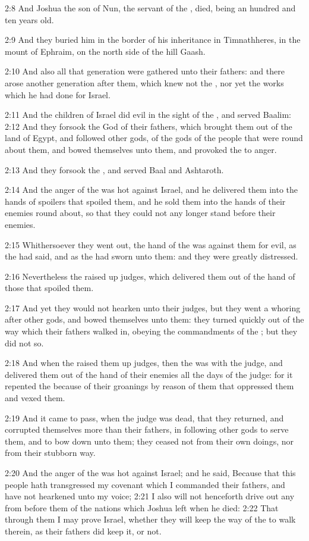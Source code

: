 2:8 And Joshua the son of Nun, the servant of the \LORD, died, being an hundred and ten years old.

2:9 And they buried him in the border of his inheritance in Timnathheres, in the mount of Ephraim, on the north side of the hill Gaash.

2:10 And also all that generation were gathered unto their fathers: and there arose another generation after them, which knew not the \LORD, nor yet the works which he had done for Israel.

2:11 And the children of Israel did evil in the sight of the \LORD, and served Baalim: 2:12 And they forsook the \LORD God of their fathers, which brought them out of the land of Egypt, and followed other gods, of the gods of the people that were round about them, and bowed themselves unto them, and provoked the \LORD to anger.

2:13 And they forsook the \LORD, and served Baal and Ashtaroth.

2:14 And the anger of the \LORD was hot against Israel, and he delivered them into the hands of spoilers that spoiled them, and he sold them into the hands of their enemies round about, so that they could not any longer stand before their enemies.

2:15 Whithersoever they went out, the hand of the \LORD was against them for evil, as the \LORD had said, and as the \LORD had sworn unto them: and they were greatly distressed.

2:16 Nevertheless the \LORD raised up judges, which delivered them out of the hand of those that spoiled them.

2:17 And yet they would not hearken unto their judges, but they went a whoring after other gods, and bowed themselves unto them: they turned quickly out of the way which their fathers walked in, obeying the commandments of the \LORD; but they did not so.

2:18 And when the \LORD raised them up judges, then the \LORD was with the judge, and delivered them out of the hand of their enemies all the days of the judge: for it repented the \LORD because of their groanings by reason of them that oppressed them and vexed them.

2:19 And it came to pass, when the judge was dead, that they returned, and corrupted themselves more than their fathers, in following other gods to serve them, and to bow down unto them; they ceased not from their own doings, nor from their stubborn way.

2:20 And the anger of the \LORD was hot against Israel; and he said, Because that this people hath transgressed my covenant which I commanded their fathers, and have not hearkened unto my voice; 2:21 I also will not henceforth drive out any from before them of the nations which Joshua left when he died: 2:22 That through them I may prove Israel, whether they will keep the way of the \LORD to walk therein, as their fathers did keep it, or not.


